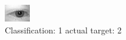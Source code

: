 \begin{figure}[h!]
\begin{center}
\includegraphics[width=0.60\columnwidth]{figures/ID452_class_1_target_2.png}
\end{center}
\caption{ Classification: 1 actual target: 2}
\label{fig:ID452_class_1_target_2}
\end{figure}
